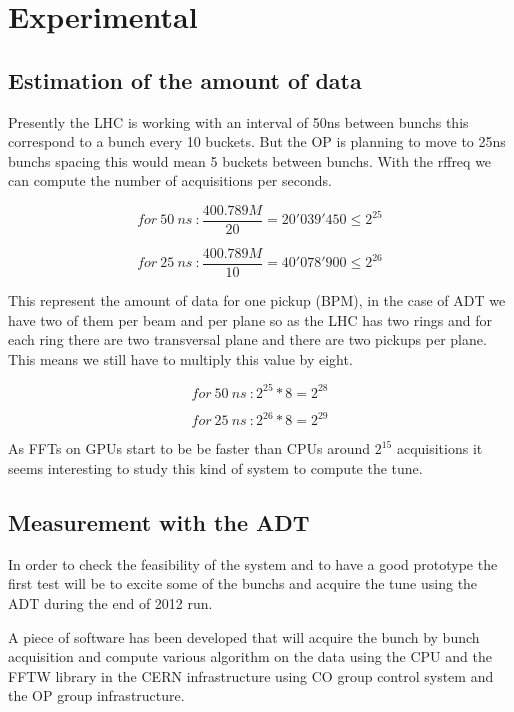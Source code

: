%

\chapter{Experimental}

\section{Estimation of the amount of data}

Presently the \gls{LHC} is working with an interval of 50ns between 
\glspl{bunch} this correspond to a bunch every 10 \glspl{bucket}. But the 
\gls{OP} is planning to move to 25ns \glspl{bunch} spacing this would mean 
5 \glspl{bucket} between \glspl{bunch}. With the \gls{rffreq} we can compute 
the number of acquisitions per seconds.

$$for~50~ns~: \frac{400.789M}{20} = 20'039'450 \leq 2^{25}$$

$$for~25~ns~: \frac{400.789M}{10} = 40'078'900 \leq 2^{26}$$ 

This represent the amount of data for one pickup (\gls{BPM}), in the case of 
\gls{ADT} we have two of them per beam and per plane so as the \gls{LHC} has 
two rings and for each ring there are two transversal plane and there are 
two pickups per plane. This means we still have to multiply this value by 
eight.

$$for~50~ns~: 2^{25} * 8 = 2^{28}$$

$$for~25~ns~: 2^{26} * 8 = 2^{29}$$

As \glspl{FFT} on \glspl{GPU} start to be be faster than \glspl{CPU} around 
$2^{15}$ acquisitions it seems interesting to study this kind of system to 
compute the \gls{tune}.

\section{Measurement with the ADT}

In order to check the feasibility of the system and to have a good prototype
the first test will be to excite some of the \glspl{bunch} and acquire the
\gls{tune} using the \gls{ADT} during the end of 2012 run.

A piece of software has been developed that will acquire the bunch by bunch 
acquisition and compute various algorithm on the data using the \gls{CPU} 
and the \gls{FFTW} library in the \gls{CERN} infrastructure using \gls{CO} 
group control system and the \gls{OP} group infrastructure.


